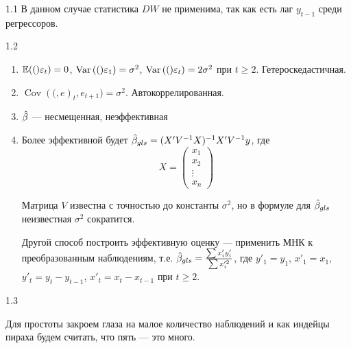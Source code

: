 \protect \hypertarget {soln:1.1}{}
\newcommand{\Var}[1]{\operatorname{Var}{\left(#1\right)}}
\newcommand{\E}[1]{\mathbb{E}{\left(#1\right)}}
\newcommand{\Cov}[2]{\operatorname{Cov}{\left(#1, #2\right)}}

\begin{solution}{{1.1}}
В данном случае статистика $DW$ не применима, так как есть лаг $y_{t-1}$ среди регрессоров.
\end{solution}
\protect \hypertarget {soln:1.2}{}
\begin{solution}{{1.2}}
\begin{enumerate}
\item $\E(\e_t)=0$, $\Var(\e_1)=\sigma^2$, $\Var(\e_t)=2\sigma^2$ при $t\geq 2$.  Гетероскедастичная.
\item $\Cov(e_t,e_{t+1})=\sigma^2$. Автокоррелированная.
\item $\hat{\beta}$ --- несмещенная, неэффективная
\item Более эффективной будет $\hat{\beta}_{gls}=(X'V^{-1}X)^{-1}X'V^{-1}y$, где
\[
X=\begin{pmatrix}
x_1 \\
x_2 \\
\vdots \\
x_n
\end{pmatrix}
\]

Матрица $V$ известна с точностью до константы $\sigma^2$, но в формуле для $\hat{\beta}_{gls}$ неизвестная $\sigma^2$ сократится.

Другой способ построить эффективную оценку --- применить МНК к преобразованным наблюдениям, т.е. $\hat{\beta}_{gls}=\frac{\sum x'_i y'_i}{\sum x_i^{\prime 2}}$, где $y'_1=y_1$, $x'_1=x_1$, $y'_t=y_t-y_{t-1}$, $x'_t=x_t-x_{t-1}$ при $t\geq 2$.
\end{enumerate}
\end{solution}
\protect \hypertarget {soln:1.3}{}
\begin{solution}{{1.3}}

Для простоты закроем глаза на малое количество наблюдений и как индейцы пираха будем считать, что пять --- это много.

\end{solution}
\protect \hypertarget {soln:1.4}{}
